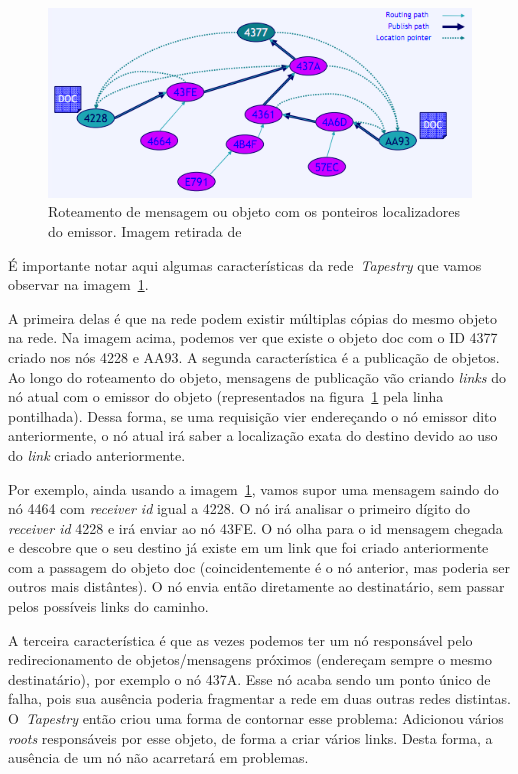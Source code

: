 \begin{figure}
	\centering
	\includegraphics[scale=0.6]{images/rede-tapestry.png}
	\caption{Roteamento de mensagem ou objeto com os ponteiros localizadores do emissor. Imagem retirada de~\cite{welzi11}}
	\label{fig:rede-tapestry}
\end{figure}

É importante notar aqui algumas características da rede~\emph{Tapestry} que vamos observar na imagem~\ref{fig:rede-tapestry}.

A primeira delas é que na rede podem existir múltiplas cópias do mesmo objeto na rede. Na imagem acima, podemos ver que existe o objeto doc com o ID 4377 criado nos nós 4228 e AA93. A segunda característica é a publicação de objetos. Ao longo do roteamento do objeto, mensagens de publicação vão criando \emph{links} do nó atual com o emissor do objeto (representados na figura~\ref{fig:rede-tapestry} pela linha pontilhada). Dessa forma, se uma requisição vier endereçando o nó emissor dito anteriormente, o nó atual irá saber a localização exata do destino devido ao uso do \emph{link} criado anteriormente.

Por exemplo, ainda usando a imagem~\ref{fig:rede-tapestry}, vamos supor uma mensagem saindo do nó 4464 com \emph{receiver id} igual a 4228. O nó irá analisar o primeiro dígito do \emph{receiver id} 4228 e irá enviar ao nó 43FE. O nó olha para o id mensagem chegada e descobre que o seu destino já existe em um link que foi criado anteriormente com a passagem do objeto doc (coincidentemente é o nó anterior, mas poderia ser outros mais distântes). O nó envia então diretamente ao destinatário, sem passar pelos possíveis links do caminho.

A terceira característica é que as vezes podemos ter um nó responsável pelo redirecionamento de objetos/mensagens próximos (endereçam sempre o mesmo destinatário), por exemplo o nó 437A. Esse nó acaba sendo um ponto único de falha, pois sua ausência poderia fragmentar a rede em duas outras redes distintas. O~\emph{Tapestry} então criou uma forma de contornar esse problema: Adicionou vários \emph{roots} responsáveis por esse objeto, de forma a criar vários links. Desta forma, a ausência de um nó não acarretará em problemas.

